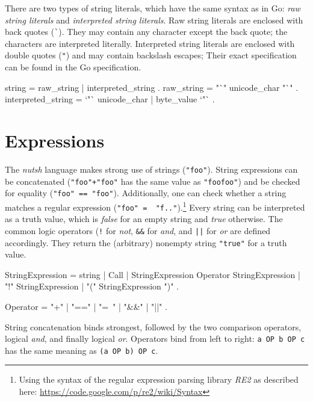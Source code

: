 \documentclass[paper=a4,twoside,abstract=on,cleardoublepage=empty,numbers=noenddot,toc=bib,12pt,appendixprefix=true]{scrreprt}
\begin{document}

There are two types of string literals, which have the same syntax as in Go: \emph{raw string literals} and \emph{interpreted string literals}. Raw string literals are enclosed with back quotes (\texttt{\`}). They may contain any character except the back quote; the characters are interpreted literally. Interpreted string literals are enclosed with double quotes (\texttt{"}) and may contain backslash escapes; Their exact specification can be found in the Go specification\cite{gospec}.

\begin{ebnf}
string = raw_string | interpreted_string .
raw_string = "`" { unicode_char } "`" .
interpreted_string = `"` { unicode_char | byte_value } `"` .
\end{ebnf}

\section{Expressions}


The \emph{nutsh} language makes strong use of strings (\texttt{"foo"}). String expressions can be concatenated (\texttt{"foo"+"foo"} has the same value as \texttt{"foofoo"}) and be checked for equality (\texttt{"foo" == "foo"}). Additionally, one can check whether a string matches a regular expression (\texttt{"foo" =~ "f.."}).\footnote{Using the syntax of the regular expression parsing library \emph{RE2} as described here: \url{https://code.google.com/p/re2/wiki/Syntax}} Every string can be interpreted as a truth value, which is \emph{false} for an empty string and \emph{true} otherwise. The common logic operators (\texttt{!} for \emph{not}, \texttt{\&\&} for \emph{and}, and \texttt{||} for \emph{or} are defined accordingly. They return the (arbitrary) nonempty string \texttt{"true"} for a truth value.

\begin{ebnf}
StringExpression =
        string | Call | StringExpression Operator StringExpression |
        "!" StringExpression | "(" StringExpression ")" .

Operator = "+" | "==" | "=~" | "&&" | "||" .
\end{ebnf}


String concatenation binds strongest, followed by the two comparison operators, logical \emph{and}, and finally logical \emph{or}. Operators bind from left to right: \texttt{a OP b OP c} has the same meaning as \texttt{(a OP b) OP c}.
\end{document}
